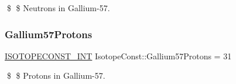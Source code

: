 \$ \$ Neutrons in Gallium-\/57. \mbox{\label{group___isotope_const-_gallium-_ga57_gad9db1252763a30c2663984bc6e6ac5f7}} 
\subsubsection{\texorpdfstring{Gallium57\+Protons}{Gallium57Protons}}
{\footnotesize\ttfamily \mbox{\hyperlink{group___isotope_const-_macros_ga5f18360b3e99483a35c32d789e62621c}{I\+S\+O\+T\+O\+P\+E\+C\+O\+N\+S\+T\+\_\+\+I\+NT}} Isotope\+Const\+::\+Gallium57\+Protons = 31}

\$ \$ Protons in Gallium-\/57. 
